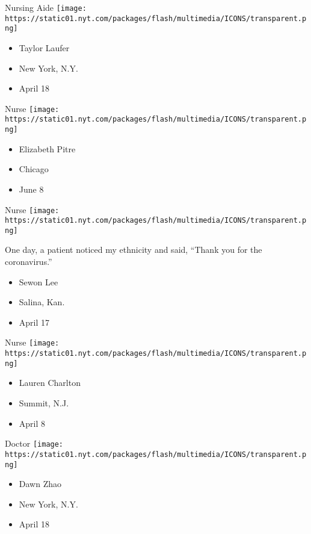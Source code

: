 Nursing Aide
\texttt{[image: https://static01.nyt.com/packages/flash/multimedia/ICONS/transparent.png]}

\begin{itemize}
\tightlist
\item
  Taylor Laufer
\item
  New York, N.Y.
\item
  April 18
\end{itemize}

\protect\hyperlink{item-elizabeth-pitre}{}

Nurse
\texttt{[image: https://static01.nyt.com/packages/flash/multimedia/ICONS/transparent.png]}

\begin{itemize}
\tightlist
\item
  Elizabeth Pitre
\item
  Chicago
\item
  June 8
\end{itemize}

\protect\hyperlink{item-sewon-lee}{}

Nurse
\texttt{[image: https://static01.nyt.com/packages/flash/multimedia/ICONS/transparent.png]}

One day, a patient noticed my ethnicity and said, ``Thank you for the
coronavirus.''

\begin{itemize}
\tightlist
\item
  Sewon Lee
\item
  Salina, Kan.
\item
  April 17
\end{itemize}

\protect\hyperlink{item-lauren-charlton}{}

Nurse
\texttt{[image: https://static01.nyt.com/packages/flash/multimedia/ICONS/transparent.png]}

\begin{itemize}
\tightlist
\item
  Lauren Charlton
\item
  Summit, N.J.
\item
  April 8
\end{itemize}

\protect\hyperlink{item-dawn-zhao}{}

Doctor
\texttt{[image: https://static01.nyt.com/packages/flash/multimedia/ICONS/transparent.png]}

\begin{itemize}
\tightlist
\item
  Dawn Zhao
\item
  New York, N.Y.
\item
  April 18
\end{itemize}

